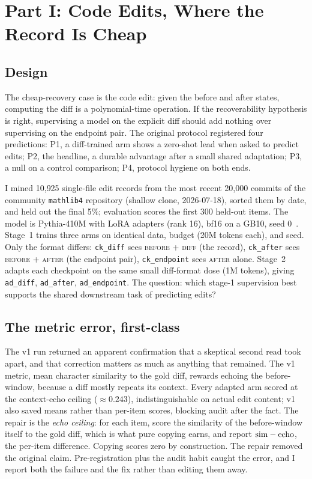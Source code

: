 \section{Part I: Code Edits, Where the Record Is Cheap}\label{sec:part1}

\subsection{Design}

The cheap-recovery case is the code edit: given the before and after states, computing the diff is a polynomial-time operation. If the recoverability hypothesis is right, supervising a model on the explicit diff should add nothing over supervising on the endpoint pair. The original protocol registered four predictions: P1, a diff-trained arm shows a zero-shot lead when asked to predict edits; P2, the headline, a durable advantage after a small shared adaptation; P3, a null on a control comparison; P4, protocol hygiene on both ends.

I mined 10{,}925 single-file edit records from the most recent 20{,}000 commits of the community \texttt{mathlib4} repository (shallow clone, 2026-07-18), sorted them by date, and held out the final 5\%; evaluation scores the first 300 held-out items. The model is Pythia-410M with LoRA adapters (rank 16), bf16 on a GB10, seed 0~\cite{biderman2023pythia}. Stage~1 trains three arms on identical data, budget (20M tokens each), and seed. Only the format differs: \texttt{ck\_diff} sees \textsc{before} + \textsc{diff} (the record), \texttt{ck\_after} sees \textsc{before} + \textsc{after} (the endpoint pair), \texttt{ck\_endpoint} sees \textsc{after} alone. Stage~2 adapts each checkpoint on the same small diff-format dose (1M tokens), giving \texttt{ad\_diff}, \texttt{ad\_after}, \texttt{ad\_endpoint}. The question: which stage-1 supervision best supports the shared downstream task of predicting edits?

\subsection{The metric error, first-class}

The v1 run returned an apparent confirmation that a skeptical second read took apart, and that correction matters as much as anything that remained. The v1 metric, mean character similarity to the gold diff, rewards echoing the before-window, because a diff mostly repeats its context. Every adapted arm scored at the context-echo ceiling ($\approx 0.243$), indistinguishable on actual edit content; v1 also saved means rather than per-item scores, blocking audit after the fact. The repair is the \emph{echo ceiling}: for each item, score the similarity of the before-window itself to the gold diff, which is what pure copying earns, and report $\mathrm{sim}-\mathrm{echo}$, the per-item difference. Copying scores zero by construction. The repair removed the original claim. Pre-registration plus the audit habit caught the error, and I report both the failure and the fix rather than editing them away.


